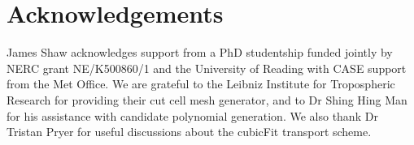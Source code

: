 \documentclass[times]{elsarticle}
\begin{document}


\section{Acknowledgements}
James Shaw acknowledges support from a PhD studentship funded jointly by NERC grant NE/K500860/1 and the University of Reading with CASE support from the Met Office.
We are grateful to the Leibniz Institute for Tropospheric Research for providing their cut cell mesh generator, and to Dr Shing Hing Man for his assistance with candidate polynomial generation.  We also thank Dr Tristan Pryer for useful discussions about the cubicFit transport scheme.






\end{document}

